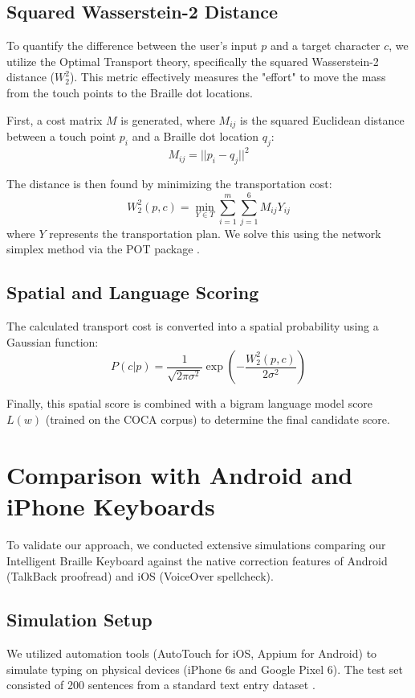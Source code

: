 \documentclass[manuscript,review]{acmart}
\begin{document}
\subsection{Squared Wasserstein-2 Distance}
To quantify the difference between the user's input $p$ and a target character $c$, we utilize the Optimal Transport theory, specifically the squared Wasserstein-2 distance ($W_2^2$). This metric effectively measures the "effort" to move the mass from the touch points to the Braille dot locations.

First, a cost matrix $M$ is generated, where $M_{ij}$ is the squared Euclidean distance between a touch point $p_i$ and a Braille dot location $q_j$:
\begin{equation}
    M_{ij} = ||p_i - q_j||^2
\end{equation}

The distance is then found by minimizing the transportation cost:
\begin{equation}
    W_2^2(p, c) = \min_{Y \in T} \sum_{i=1}^m \sum_{j=1}^6 M_{ij} Y_{ij}
\end{equation}
where $Y$ represents the transportation plan. We solve this using the network simplex method via the POT package \cite{Flamary2021}.

\subsection{Spatial and Language Scoring}
The calculated transport cost is converted into a spatial probability using a Gaussian function:
\begin{equation}
    P(c|p) = \frac{1}{\sqrt{2\pi\sigma^2}} \exp\left(-\frac{W_2^2(p,c)}{2\sigma^2}\right)
\end{equation}

Finally, this spatial score is combined with a bigram language model score $L(w)$ (trained on the COCA corpus) to determine the final candidate score.

\section{Comparison with Android and iPhone Keyboards}

To validate our approach, we conducted extensive simulations comparing our Intelligent Braille Keyboard against the native correction features of Android (TalkBack proofread) and iOS (VoiceOver spellcheck).

\subsection{Simulation Setup}
We utilized automation tools (AutoTouch for iOS, Appium for Android) to simulate typing on physical devices (iPhone 6s and Google Pixel 6). The test set consisted of 200 sentences from a standard text entry dataset \cite{Vertanen2011}.
\end{document}
